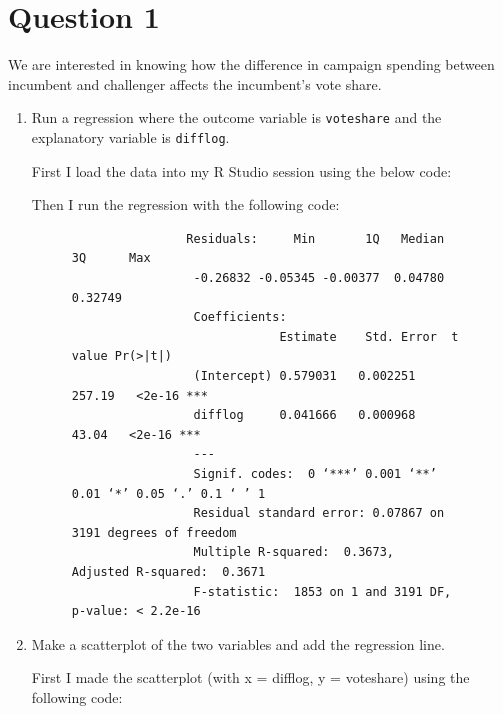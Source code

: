 \documentclass[12pt,letterpaper]{article}
\begin{document}
\section*{Question 1}
\vspace{.25cm}
\noindent We are interested in knowing how the difference in campaign spending between incumbent and challenger affects the incumbent's vote share. 
	\begin{enumerate}
		\item Run a regression where the outcome variable is \texttt{voteshare} and the explanatory variable is \texttt{difflog}.	
		
		First I load the data into my R Studio session using the below code:
		 
		
		Then I run the regression with the following code:
		 
			\begin{figure}
			\begin{verbatim}
				Residuals:     Min       1Q   Median       3Q      Max
				 -0.26832 -0.05345 -0.00377  0.04780  0.32749 
				 Coefficients:            
				             Estimate    Std. Error  t value Pr(>|t|)
				 (Intercept) 0.579031   0.002251  257.19   <2e-16 ***
				 difflog     0.041666   0.000968   43.04   <2e-16 ***
				 ---
				 Signif. codes:  0 ‘***’ 0.001 ‘**’ 0.01 ‘*’ 0.05 ‘.’ 0.1 ‘ ’ 1
				 Residual standard error: 0.07867 on 3191 degrees of freedom
				 Multiple R-squared:  0.3673,	Adjusted R-squared:  0.3671 
				 F-statistic:  1853 on 1 and 3191 DF,  p-value: < 2.2e-16
			\end{verbatim}
		
		\end{figure}
		
		\vspace{5cm}
		\item Make a scatterplot of the two variables and add the regression line. 
		
		First I made the scatterplot (with x = difflog, y = voteshare) using the following code:
		 
		

\end{enumerate}
\end{document}
